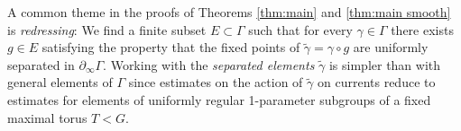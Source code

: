 \documentclass[12pt]{amsbook}%
\theoremstyle{definition}
\theoremstyle{remark}
\numberwithin{section}{chapter}
\numberwithin{subsection}{section}
\numberwithin{figure}{chapter}
\DeclareMathOperator{\Th}{Th}
\newcommand\intcur[1]{\llbracket #1 \rrbracket}
\def\bP{{\mathbb{P}}}
\def\cF{{\mathscr{F}}}
\def\cP{{\mathscr{P}}}
\def\Ga{\Gamma}
\def\ga{\gamma}
\def\geo{\partial_\infty}
\begin{document}
A common theme in the proofs of Theorems \ref{thm:main} and \ref{thm:main smooth} is {\em redressing}: We find a finite subset $E\subset \Ga$ such that for every $\ga\in \Ga$ there exists $g\in E$ satisfying the property that the fixed points of $\tilde\ga= \ga\circ g$ are uniformly separated in $\geo \Ga$. Working with the {\em separated elements} $\tilde\ga$ is simpler than with general elements of $\Ga$ since estimates on the action of $\tilde\ga$ on currents reduce to estimates for elements of uniformly regular 1-parameter subgroups of a fixed maximal torus $T< G$. 

%
%
%
%

\end{document}
